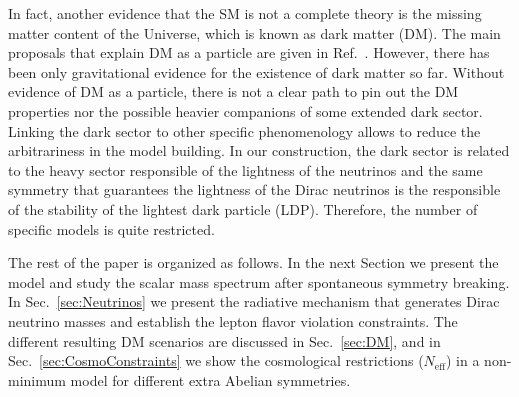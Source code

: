 \documentclass[12pt]{article}
\begin{document}
In fact, another evidence that the SM is not a complete theory is the
missing matter content of the Universe, which is known as dark matter
(DM).
The main proposals that explain DM as a particle are given in
Ref.~\cite{Bertone:2004pz}.
However, there has been only gravitational evidence for the existence
of dark matter so far.
Without evidence of DM as a particle, there is not a clear path to pin
out the DM properties nor the possible heavier companions of some
extended dark sector. 
Linking the dark sector to other specific phenomenology allows to
reduce the arbitrariness in the model building.
In our construction, the dark sector is related to the heavy sector
responsible of the lightness of the neutrinos and the same symmetry
that guarantees the lightness of the Dirac neutrinos is the
responsible of the stability of the lightest dark particle (LDP).
Therefore, the number of specific models is quite restricted.



The rest of the paper is organized as follows. In the next Section we present the model and study the scalar mass spectrum after spontaneous symmetry breaking. In Sec.~\ref{sec:Neutrinos} we present the radiative mechanism that generates Dirac neutrino masses and establish  the lepton flavor violation constraints. The different resulting DM scenarios  are discussed in Sec.~\ref{sec:DM}, and in Sec.~\ref{sec:CosmoConstraints} we show the cosmological restrictions ($N_{\text{eff}}$) in a non-minimum model for different extra Abelian symmetries.
\end{document}
